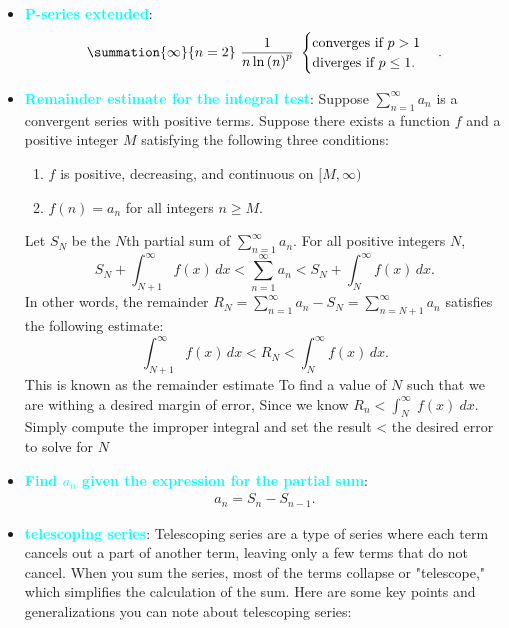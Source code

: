\documentclass{report}
\begin{document}
\begin{itemize}
    \item \textbf{\textcolor{cyan}{P-series extended}}:
        \begin{align*}
            \summation{\infty}{n=2}\ \frac{1}{n\ln{(n)}^{p}}\ 
            \begin{cases}
                \text{converges if } p>1 \\
                \text{diverges if } p \leq 1.
            \end{cases}
        .\end{align*}
    \item \textbf{\textcolor{cyan}{Remainder estimate for the integral test}}:
        Suppose \( \sum_{n=1}^{\infty} a_n \)
        is a convergent series with positive terms. Suppose there exists a function \( f \) and a positive integer $M$
        satisfying the following three conditions:
        \begin{enumerate}
            \item \( f \) is positive, decreasing, and continuous on $[M,\infty)$
            \item \( f(n) = a_n \) for all integers \( n \geq M \).
        \end{enumerate}
        Let \( S_N \) be the \( N \)th partial sum of \( \sum_{n=1}^{\infty} a_n \).
        For all positive integers \( N \),
        \[
            S_N + \int_{N+1}^{\infty} f(x) \, dx < \sum_{n=1}^{\infty} a_n < S_N + \int_{N}^{\infty} f(x) \, dx.
        \]
        In other words, the remainder \( R_N = \sum_{n=1}^{\infty} a_n - S_N = \sum_{n=N+1}^{\infty} a_n \)
        satisfies the following estimate:
        \[
            \int_{N+1}^{\infty} f(x) \, dx < R_N < \int_{N}^{\infty} f(x) \, dx.
        \]
        This is known as the remainder estimate 
        \bigbreak \noindent 
        To find a value of $N$ such that we are withing a desired margin of error, Since we know $R_{n} < \int_{N}^{\infty}\ f(x)\ dx $. Simply compute the improper integral and set the result < the desired error to solve for $N$
    \item \textbf{\textcolor{cyan}{Find $a_{n}$ given the expression for the partial sum}}:
        \begin{align*}
            a_{n} = S_{n} - S_{n-1}
        .\end{align*}
    \item \textbf{\textcolor{cyan}{telescoping series}}: Telescoping series are a type of series where each term cancels out a part of another term, leaving only a few terms that do not cancel. When you sum the series, most of the terms collapse or "telescope," which simplifies the calculation of the sum. Here are some key points and generalizations you can note about telescoping series:

\end{itemize}
\end{document}
